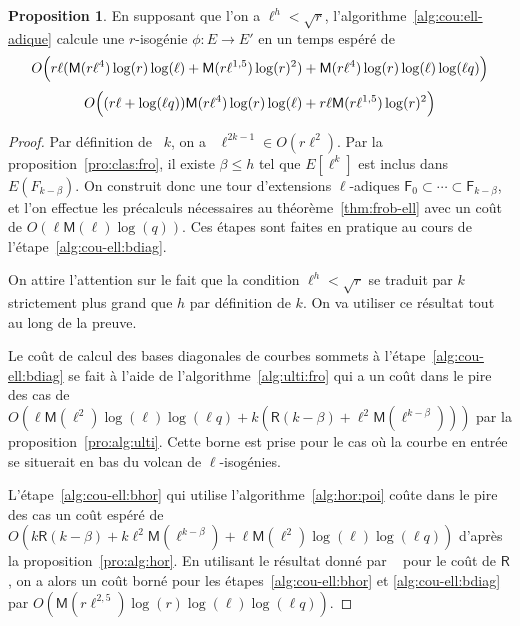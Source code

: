 \documentclass[10pt,a4paper]{book}
\theoremstyle{plain}
\theoremstyle{definition}
\theoremstyle{definition}
\theoremstyle{definition}
\newtheorem{prop}[thm]{Proposition}
\theoremstyle{definition}
\theoremstyle{remark}
\theoremstyle{remark}
\theoremstyle{definition}
\begin{document}
\begin{prop}
  \label{pro:full-complexity}
  En supposant que l'on a $\ell^h<\sqrt{r}$, 
  l'algorithme~\ref{alg:cou:ell-adique} calcule une $r$-isogénie 
  ${\phi:E \rightarrow E'}$ en un temps espéré de 
 \[
O\Bigl(r \ell( \mathsf{M}(r \ell^4) \log(r) \log(\ell) + \mathsf{M}(r \ell^{1,5}) \log(r)^2) + \mathsf{M}(r \ell^4) \log(r) \log(\ell) \log(\ell q) \Bigr) 
 \]
  \[
O\Bigl( (r \ell + \log(\ell q) ) \mathsf{M}(r \ell^4) \log(r) \log(\ell) +  r\ell \mathsf{M}(r \ell^{1,5}) \log(r)^2 \Bigr) 
 \]
\end{prop}
\begin{proof}
Par définition de ~$k$, on a ~$\ell^{2k-1} \in O(r\ell^2)$.
  Par la proposition~\ref{pro:clas:fro}, il existe $\beta \leqslant h$ tel que
  $E[\ell^k]$ est inclus dans $E(F_{k-\beta})$. On construit donc une
  tour d'extensions $\ell$-adiques $\mathsf{F}_0\subset\cdots\subset 
  \mathsf{F}_{k-\beta}$, et l'on effectue les précalculs nécessaires au 
  théorème~\ref{thm:frob-ell} avec un coût de 
  $O(\ell\mathsf{M}(\ell)\log(q))$. Ces étapes sont faites en pratique au cours
  de l'étape~\ref{alg:cou-ell:bdiag}.
  
  On attire l'attention sur le fait que la condition $\ell^h<\sqrt{r}$ se traduit par 
  $k$ strictement plus grand que $h$ par définition de $k$.
  On va utiliser ce résultat tout au long de la preuve. 
 
  Le coût de calcul des bases diagonales de courbes sommets à 
  l'étape~\ref{alg:cou-ell:bdiag} se fait à l'aide de 
  l'algorithme~\ref{alg:ulti:fro} qui a un coût dans le pire des cas
  de $O(\ell\mathsf{M}(\ell^2)\log(\ell)\log(\ell q)+k(\mathsf{R}(k-\beta) +  \ell^2\mathsf{M}(\ell^{k-\beta})))$ 
  par la proposition~\ref{pro:alg:ulti}. Cette borne est prise pour le cas où 
  la courbe en entrée se situerait en bas du volcan de $\ell$-isogénies. 

  L'étape~\ref{alg:cou-ell:bhor} qui utilise 
  l'algorithme~\ref{alg:hor:poi} coûte dans le pire des cas un coût espéré de
  $O(k\mathsf{R}(k-\beta) + k\ell^2\mathsf{M}(\ell^{k-\beta}) + \ell\mathsf{M}(\ell^2)\log(\ell)\log(\ell q))$ d'après la 
  proposition~\ref{pro:alg:hor}.
  En utilisant le  résultat  donné par ~\cite[Chapter~14.5]{vzGJG03} pour le 
  coût de $\mathsf{R}$, on a alors un coût borné pour les 
  étapes~\ref{alg:cou-ell:bhor} et \ref{alg:cou-ell:bdiag} par 
  $O(\mathsf{M}(r\ell^{2,5})\log(r)\log(\ell)\log(\ell q))$. 
  

\end{proof}
\end{document}
